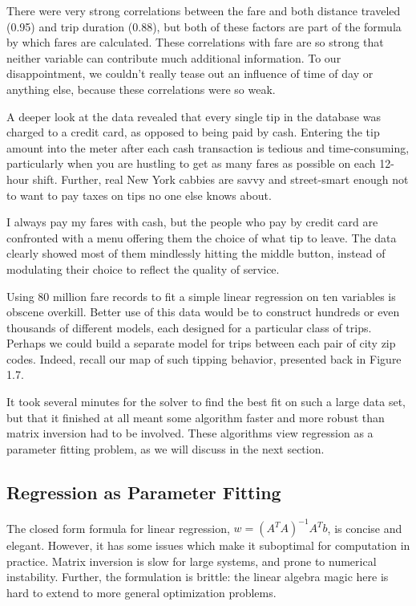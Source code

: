 \documentclass[10pt]{article}
\begin{document}
There were very strong correlations between the fare and both distance traveled (0.95) and trip duration (0.88), but both of these factors are part of the formula by which fares are calculated. These correlations with fare are so strong that neither variable can contribute much additional information. To our disappointment, we couldn't really tease out an influence of time of day or anything else, because these correlations were so weak.

A deeper look at the data revealed that every single tip in the database was charged to a credit card, as opposed to being paid by cash. Entering the tip amount into the meter after each cash transaction is tedious and time-consuming, particularly when you are hustling to get as many fares as possible on each 12-hour shift. Further, real New York cabbies are savvy and street-smart enough not to want to pay taxes on tips no one else knows about.

I always pay my fares with cash, but the people who pay by credit card are confronted with a menu offering them the choice of what tip to leave. The data clearly showed most of them mindlessly hitting the middle button, instead of modulating their choice to reflect the quality of service.

Using 80 million fare records to fit a simple linear regression on ten variables is obscene overkill. Better use of this data would be to construct hundreds or even thousands of different models, each designed for a particular class of trips. Perhaps we could build a separate model for trips between each pair of city zip codes. Indeed, recall our map of such tipping behavior, presented back in Figure 1.7.

It took several minutes for the solver to find the best fit on such a large data set, but that it finished at all meant some algorithm faster and more robust than matrix inversion had to be involved. These algorithms view regression as a parameter fitting problem, as we will discuss in the next section.

\subsection{Regression as Parameter Fitting}
The closed form formula for linear regression, $w=(A^{T} A)^{-1} A^{T} b$, is concise and elegant. However, it has some issues which make it suboptimal for computation in practice. Matrix inversion is slow for large systems, and prone to numerical instability. Further, the formulation is brittle: the linear algebra magic here is hard to extend to more general optimization problems.
\end{document}
